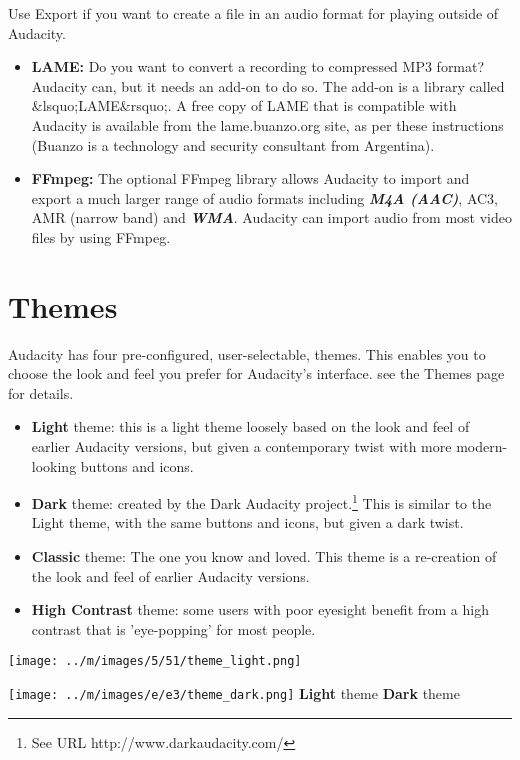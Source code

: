 \documentclass[twocolumn]{book}
\begin{document}
Use Export if you want to create a file in an audio format for playing outside of Audacity.
\begin{itemize}
\item  \textbf{LAME:} Do you want to convert a recording to compressed MP3 format? Audacity can, but it needs an add-on to do so.  The add-on is a library called \&lsquo;LAME\&rsquo;.  A free copy of LAME that is compatible with Audacity is available from the   lame.buanzo.org site, as per these instructions (Buanzo is a technology and security consultant from Argentina). 
\item  \textbf{FFmpeg:} The optional FFmpeg library allows Audacity to import and export a much larger range of audio formats including \textit{\textbf{M4A (AAC)}}, AC3, AMR (narrow band) and \textit{\textbf{WMA}}. Audacity can import audio from most video files by using FFmpeg.
\end{itemize}



\section{Themes}


Audacity has four pre-configured, user-selectable, themes.  This enables you to choose the look and feel you prefer for Audacity's interface. see the Themes page for details.
\begin{itemize}
\item \textbf{Light} theme: this is a light theme loosely based on the look and feel of earlier Audacity versions, but given a contemporary twist with more modern-looking buttons and icons. 
\item \textbf{Dark} theme: created by the Dark Audacity project.\footnote{See URL http://www.darkaudacity.com/} This is similar to the Light theme, with the same buttons and icons, but given a dark twist.
\item \textbf{Classic} theme: The one you know and loved. This theme is a re-creation of the look and feel of earlier Audacity versions. 
\item \textbf{High Contrast} theme: some users with poor eyesight benefit from a high contrast that is 'eye-popping' for most people.
\end{itemize}

\* \* \* \* \par\texttt{[image: ../m/images/5/51/theme\_light.png]}
\* \* \* \* \par\texttt{[image: ../m/images/e/e3/theme\_dark.png]}
\* \* \* \* 
\textbf{Light} theme
\* \* \* \* 
\textbf{Dark} theme
\end{document}
